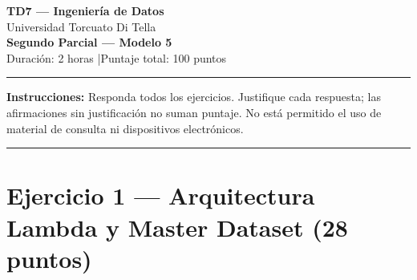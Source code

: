 \documentclass[11pt,a4paper]{article}
\begin{document}
\begin{center}
  {\LARGE\bfseries TD7 — Ingeniería de Datos}\\[6pt]
  {\large Universidad Torcuato Di Tella}\\[4pt]
  {\Large\bfseries Segundo Parcial — Modelo 5}\\[4pt]
  {\normalsize Duración: 2 horas \quad|\quad Puntaje total: 100 puntos}
\end{center}
\noindent\rule{\linewidth}{0.8pt}
\vspace{2pt}

\noindent\textbf{Instrucciones:} Responda todos los ejercicios. Justifique cada respuesta; las afirmaciones sin justificación no suman puntaje. No está permitido el uso de material de consulta ni dispositivos electrónicos.

\vspace{6pt}
\noindent\rule{\linewidth}{0.4pt}

\section*{Ejercicio 1 — Arquitectura Lambda y Master Dataset \hfill\normalfont(28 puntos)}
\end{document}
